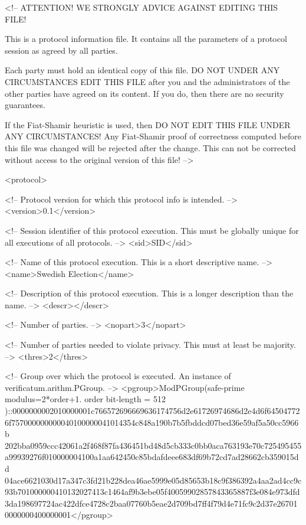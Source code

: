 
<!-- ATTENTION! WE STRONGLY ADVICE AGAINST EDITING THIS FILE!
     
     This is a protocol information file. It contains all the 
     parameters of a protocol session as agreed by all parties.
     
     Each party must hold an identical copy of this file. DO NOT 
     UNDER ANY CIRCUMSTANCES EDIT THIS FILE after you and the 
     administrators of the other parties have agreed on its content.
     If you do, then there are no security guarantees.
     
     If the Fiat-Shamir heuristic is used, then DO NOT EDIT THIS 
     FILE UNDER ANY CIRCUMSTANCES! Any Fiat-Shamir proof of 
     correctness computed before this file was changed will be 
     rejected after the change. This can not be corrected without 
     access to the original version of this file! -->

<protocol>

   <!-- Protocol version for which this protocol info is intended. -->
   <version>0.1</version>

   <!-- Session identifier of this protocol execution. This must be 
        globally unique for all executions of all protocols. -->
   <sid>SID</sid>

   <!-- Name of this protocol execution. This is a short descriptive 
        name. -->
   <name>Swedish Election</name>

   <!-- Description of this protocol execution. This is a longer 
        description than the name. -->
   <descr></descr>

   <!-- Number of parties. -->
   <nopart>3</nopart>

   <!-- Number of parties needed to violate privacy. This must at 
        least be majority. -->
   <thres>2</thres>

   <!-- Group over which the protocol is executed. An instance of 
        verificatum.arithm.PGroup. -->
   <pgroup>ModPGroup(safe-prime modulus=2*order+1. order bit-length = 512
)::0000000002010000001c766572696669636174756d2e61726974686d2e4d6f64504772
6f757000000000040100000041014354c848a190b7b5fbddcd07bed36e59af5a50cc5966b
202bba0959ccc42061a2f468f87fa436451bd48d5cb333c0bb0aca763193e70c725495455
a99939276f010000004100a1aa642450c85bdafdeee683df69b72cd7ad28662cb359015dd
04ace6621030d17a347c3fd21b228dea46ae5999e05d85653b18c9f386392a4aa2ad4cc9c
93b701000000410132027413c1464af9b3ebe05f40059902857843365887f3e084e973dfd
3da198697724ac422dfce4728c2baa07760b5eae2d709bd7ff4f79d4e71fc9c2d37e26701
0000000400000001</pgroup>


